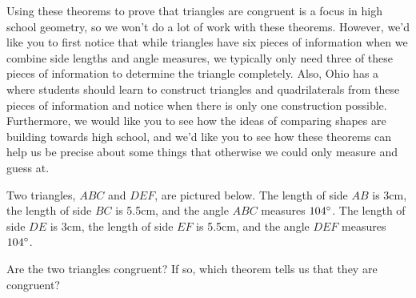 \documentclass{ximera}
\begin{document}
Using these theorems to prove that triangles are congruent is a focus in high school geometry, so we won't do a lot of work with these theorems. However, we'd like you to first notice that while triangles have six pieces of information when we combine side lengths and angle measures, we typically only need three of these pieces of information to determine the triangle completely. Also, Ohio has a  where students should learn to construct triangles and quadrilaterals from these pieces of information and notice when there is only one construction possible. Furthermore, we would like you to see how the ideas of comparing shapes are building towards high school, and we'd like you to see how these theorems can help us be precise about some things that otherwise we could only measure and guess at.

\begin{example} 
Two triangles, $ABC$ and $DEF$, are pictured below. The length of side $AB$ is 3cm, the length of side $BC$ is 5.5cm, and the angle $ABC$ measures $104\degree$.  The length of side $DE$ is 3cm, the length of side $EF$ is 5.5cm, and the angle $DEF$ measures $104\degree$.
\begin{image} \end{image}
Are the two triangles congruent? If so, which theorem tells us that they are congruent?
\begin{multipleChoice}
\end{multipleChoice}
\end{example}
\end{document}
